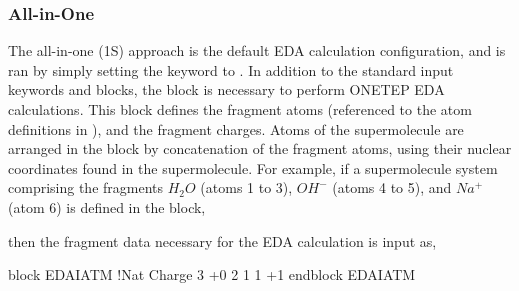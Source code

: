 \documentclass[letterpaper,10pt,english]{sphinxmanual}
\begin{document}
\subsubsection{All-in-One}
\label{\detokenize{EDA:all-in-one}}
The all-in-one (1S) approach is the default EDA calculation
configuration, and is ran by simply setting the  keyword to
. In addition to the standard input keywords and blocks, the
 block is necessary to perform ONETEP EDA calculations. This
block defines the fragment atoms (referenced to the atom definitions in
), and the fragment charges. Atoms of the supermolecule
are arranged in the  block by concatenation of the
fragment atoms, using their nuclear coordinates found in the
supermolecule. For example, if a supermolecule system comprising the
fragments \(H_2O\) (atoms 1 to 3), \(OH^-\) (atoms 4 to 5), and
\(Na^+\) (atom 6) is defined in the  block,

%
\begin{sphinxVerbatim}[commandchars=\\\{\}]
 
                
                
                
                
                
               
 
\end{sphinxVerbatim}

then the fragment data necessary for the EDA calculation is input as,

%
\begin{sphinxVerbatim}[commandchars=\\\{\}]
\PYGZpc{}block EDA\PYGZus{}IATM
  !N\PYGZus{}at  Charge
   3     +0
   2     \PYGZhy{}1
   1     +1
\PYGZpc{}endblock EDA\PYGZus{}IATM
\end{sphinxVerbatim}
\end{document}
